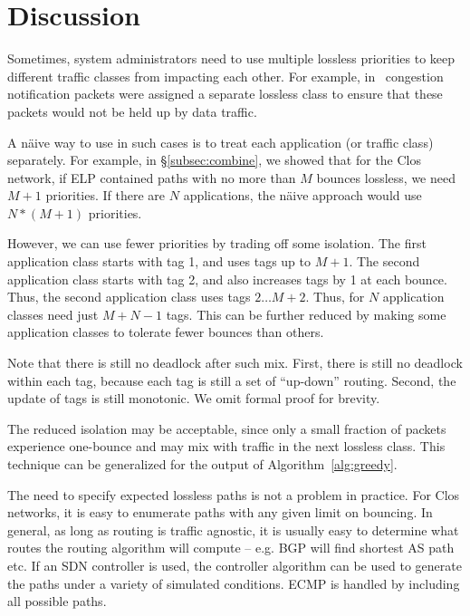 \section{Discussion}

 Sometimes, system administrators need to
use multiple lossless priorities to keep different traffic classes from
impacting each other. For example, in~\cite{dcqcn} congestion notification
packets were assigned a separate lossless class to ensure that these packets
would not be held up by data traffic.

A n{\"a}ive way to use \sysname{} in such cases is to treat each application (or
traffic class) separately.  For example, in \S\ref{subsec:combine}, we showed
that for the Clos network, if ELP contained paths with no more than $M$ bounces
lossless, we need $M+1$ priorities. If there are $N$ applications, the n{\"a}ive
approach would use $N*(M+1)$ priorities. 

However, we can use fewer priorities by trading off some isolation.  The first
application class starts with tag 1, and uses tags up to $M+1$.  The second
application class starts with tag 2, and also increases tags by 1 at each
bounce.  Thus, the second application class uses tags $2 \ldots M+2$. Thus, for
$N$ application classes need just $M + N -1$ tags. This can be further reduced
by making some application classes to tolerate fewer bounces than others.

Note that there is still no deadlock after such mix. First, there is still no
deadlock within each tag, because each tag is still a set of ``up-down''
routing. Second, the update of tags is still monotonic. We omit formal proof for
brevity.

The reduced isolation may be acceptable, since only a small fraction of packets
experience one-bounce and may mix with traffic in the next lossless class.  This
technique can be generalized for the output of Algorithm~\ref{alg:greedy}.

 The need to specify expected lossless paths is not a
problem in practice. For Clos networks, it is easy to enumerate paths with any
given limit on bouncing. In general, as long as routing is traffic agnostic, it
is usually easy to determine what routes the routing algorithm will compute --
e.g. BGP will find shortest AS path etc.  If an SDN controller is used, the
controller algorithm can be used to generate the paths under a variety of
simulated conditions. ECMP is handled by including all possible paths.

